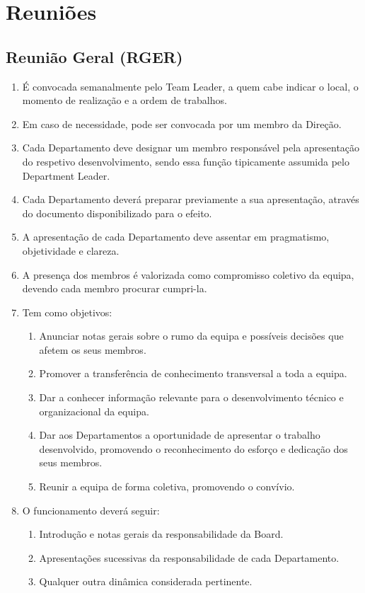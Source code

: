 \chapter{Reuniões}

\section{Reunião Geral (RGER)}
\begin{enumerate}
  \item É convocada semanalmente pelo Team Leader, a quem cabe indicar o local, o momento de realização e a ordem de trabalhos.
  \item Em caso de necessidade, pode ser convocada por um membro da Direção.
  \item Cada Departamento deve designar um membro responsável pela apresentação do respetivo desenvolvimento, sendo essa função tipicamente assumida pelo Department Leader.
  \item Cada Departamento deverá preparar previamente a sua apresentação, através do documento disponibilizado para o efeito.
  \item A apresentação de cada Departamento deve assentar em pragmatismo, objetividade e clareza.
  \item A presença dos membros é valorizada como compromisso coletivo da equipa, devendo cada membro procurar cumpri-la.
  \item Tem como objetivos:
  \begin{enumerate}
    \item Anunciar notas gerais sobre o rumo da equipa e possíveis decisões que afetem os seus membros.
    \item Promover a transferência de conhecimento transversal a toda a equipa.
    \item Dar a conhecer informação relevante para o desenvolvimento técnico e organizacional da equipa.
    \item Dar aos Departamentos a oportunidade de apresentar o trabalho desenvolvido, promovendo o reconhecimento do esforço e dedicação dos seus membros.
    \item Reunir a equipa de forma coletiva, promovendo o convívio.
  \end{enumerate}
  \item O funcionamento deverá seguir:
  \begin{enumerate}
    \item Introdução e notas gerais da responsabilidade da Board.
    \item Apresentações sucessivas da responsabilidade de cada Departamento.
    \item Qualquer outra dinâmica considerada pertinente.
  \end{enumerate}
\end{enumerate}

